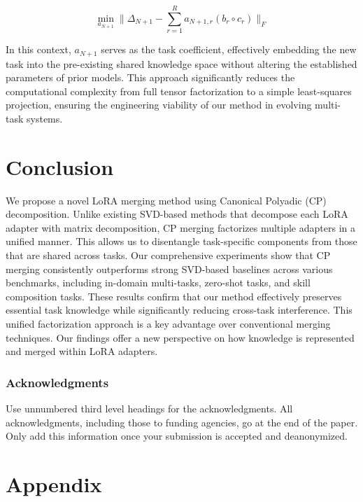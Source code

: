 \documentclass[10pt]{article} %
\begin{document}
\begin{equation}
    \min_{a_{N+1}} \|\Delta_{N+1} - \sum_{r=1}^{R} a_{N+1,r} (b_r \circ c_r)\|_F
\end{equation}

In this context, $a_{N+1}$ serves as the task coefficient, effectively embedding the new task into the pre-existing shared knowledge space without altering the established parameters of prior models. This approach significantly reduces the computational complexity from full tensor factorization to a simple least-squares projection, ensuring the engineering viability of our method in evolving multi-task systems.


\section{Conclusion}
We propose a novel LoRA merging method using Canonical Polyadic (CP) decomposition. Unlike existing SVD-based methods that decompose each LoRA adapter with matrix decomposition, CP merging factorizes multiple adapters in a unified manner. This allows us to disentangle task-specific components from those that are shared across tasks. Our comprehensive experiments show that CP merging consistently outperforms strong SVD-based baselines across various benchmarks, including in-domain multi-tasks, zero-shot tasks, and skill composition tasks. These results confirm that our method effectively preserves essential task knowledge while significantly reducing cross-task interference. This unified factorization approach is a key advantage over conventional merging techniques. Our findings offer a new perspective on how knowledge is represented and merged within LoRA adapters. 



\subsubsection*{Acknowledgments}
Use unnumbered third level headings for the acknowledgments. All
acknowledgments, including those to funding agencies, go at the end of the paper.
Only add this information once your submission is accepted and deanonymized. 




\newpage
\appendix
\section{Appendix}
\end{document}
